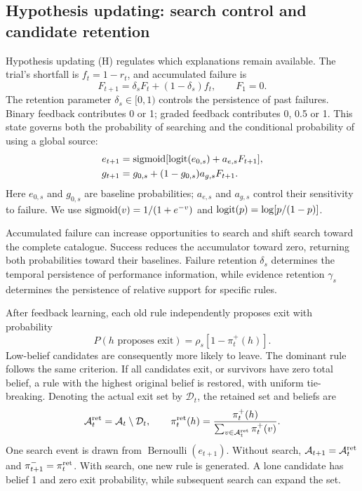 \subsection*{Hypothesis updating: search control and candidate retention}
\label{m:hypothesis}

Hypothesis updating (H) regulates which explanations remain available. The trial's shortfall is $f_t=1-r_t$, and accumulated failure is
\begin{equation}
F_{t+1}=\delta_sF_t+(1-\delta_s)f_t,\qquad F_1=0.
\label{eq:failure-accumulator}
\end{equation}
The retention parameter $\delta_s\in[0,1)$ controls the persistence of past failures. Binary feedback contributes 0 or 1; graded feedback contributes 0, 0.5 or 1. This state governs both the probability of searching and the conditional probability of using a global source:
\begin{align}
e_{t+1}&=\operatorname{sigmoid}[\operatorname{logit}(e_{0,s})+a_{e,s}F_{t+1}],\\
g_{t+1}&=g_{0,s}+(1-g_{0,s})a_{g,s}F_{t+1}.
\label{eq:search-control}
\end{align}
Here $e_{0,s}$ and $g_{0,s}$ are baseline probabilities; $a_{e,s}$ and $a_{g,s}$ control their sensitivity to failure. We use $\operatorname{sigmoid}(v)=1/(1+e^{-v})$ and $\operatorname{logit}(p)=\log[p/(1-p)]$.

Accumulated failure can increase opportunities to search and shift search toward the complete catalogue. Success reduces the accumulator toward zero, returning both probabilities toward their baselines. Failure retention $\delta_s$ determines the temporal persistence of performance information, while evidence retention $\gamma_s$ determines the persistence of relative support for specific rules.

After feedback learning, each old rule independently proposes exit with probability
\begin{equation}
P(h\text{ proposes exit})=\rho_s[1-\pi_t^+(h)].
\label{eq:candidate-exit}
\end{equation}
Low-belief candidates are consequently more likely to leave. The dominant rule follows the same criterion. If all candidates exit, or survivors have zero total belief, a rule with the highest original belief is restored, with uniform tie-breaking. Denoting the actual exit set by $\mathcal D_t$, the retained set and beliefs are
\begin{equation}
\mathcal A_t^{\rm ret}=\mathcal A_t\setminus\mathcal D_t,
\qquad
\pi_t^{\rm ret}(h)=\frac{\pi_t^+(h)}
{\sum_{v\in\mathcal A_t^{\rm ret}}\pi_t^+(v)}.
\label{eq:retained-candidates}
\end{equation}
One search event is drawn from $\operatorname{Bernoulli}(e_{t+1})$. Without search, $\mathcal A_{t+1}=\mathcal A_t^{\rm ret}$ and $\pi_{t+1}^-=\pi_t^{\rm ret}$. With search, one new rule is generated. A lone candidate has belief 1 and zero exit probability, while subsequent search can expand the set.

